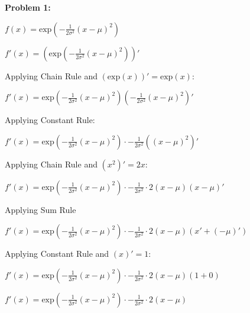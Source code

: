 \textbf{Problem 1:}

\singlespacing

$f(x) = \text{exp}(-\frac{1}{2\sigma^2}(x - \mu)^2)$

\singlespacing

$f'(x) = (\text{exp}(-\frac{1}{2\sigma^2}(x - \mu)^2))'$

\singlespacing
Applying Chain Rule and $(\text{exp}(x))' = \text{exp}(x)$:
\singlespacing

$f'(x) = \text{exp}(-\frac{1}{2\sigma^2}(x - \mu)^2) (-\frac{1}{2\sigma^2}(x - \mu)^2)'$

\singlespacing

Applying Constant Rule:

\singlespacing

$f'(x) = \text{exp}(-\frac{1}{2\sigma^2}(x - \mu)^2) \cdot -\frac{1}{2\sigma^2}((x - \mu)^2)'$

\singlespacing
Applying Chain Rule and $(x^2)' = 2x$:
\singlespacing

$f'(x) = \text{exp}(-\frac{1}{2\sigma^2}(x - \mu)^2) \cdot -\frac{1}{2\sigma^2}\cdot2(x - \mu) (x - \mu)'$

\singlespacing

Applying Sum Rule

\singlespacing

$f'(x) = \text{exp}(-\frac{1}{2\sigma^2}(x - \mu)^2) \cdot -\frac{1}{2\sigma^2}\cdot2(x - \mu) (x' + (- \mu)')$

\singlespacing

Applying Constant Rule and $(x)' = 1$:

\singlespacing

$f'(x) = \text{exp}(-\frac{1}{2\sigma^2}(x - \mu)^2) \cdot -\frac{1}{2\sigma^2}\cdot2(x - \mu) (1 + 0)$

\singlespacing

$f'(x) = \text{exp}(-\frac{1}{2\sigma^2}(x - \mu)^2) \cdot -\frac{1}{2\sigma^2}\cdot2(x - \mu)$